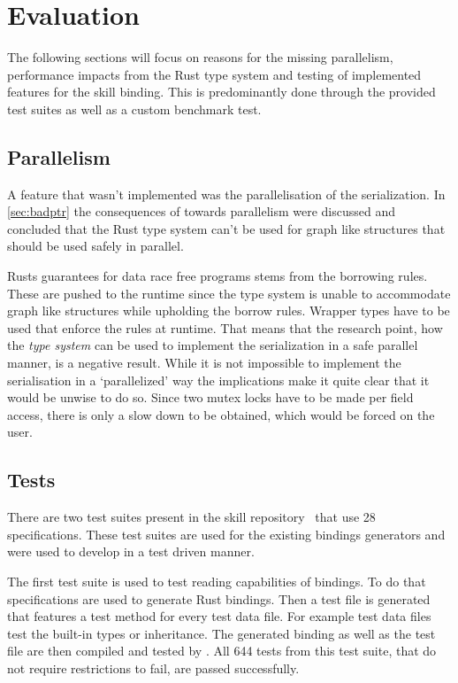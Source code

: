 \documentclass[thesis]{subfiles}
\begin{document}
\chapter{Evaluation}\label{chap:eval}
The following sections will focus on reasons for the missing parallelism, performance impacts from the Rust type system and testing of implemented features for the \gls{skill} binding.
This is predominantly done through the provided test suites as well as a custom benchmark test.

\section{Parallelism}
  A feature that wasn't implemented was the parallelisation of the serialization.
  In \autoref{sec:badptr} the consequences of \PtrT towards parallelism were discussed and concluded that the Rust type system can't be used for graph like structures that should be used safely in parallel.

  Rusts guarantees for data race free programs stems from the borrowing rules.
  These are pushed to the runtime since the type system is unable to accommodate graph like structures while upholding the borrow rules.
  Wrapper types have to be used that enforce the rules at runtime.
  That means that the research point, how the \emph{type system} can be used to implement the serialization in a safe parallel manner, is a negative result.
  While it is not impossible to implement the serialisation in a `parallelized' way the implications make it quite clear that it would be unwise to do so.
  Since two mutex locks have to be made per field access, there is only a slow down to be obtained, which would be forced on the user.

\section{Tests}
  There are two test suites present in the \gls{skill} repository~\autocite{skill-repo} that use 28 specifications.
  These test suites are used for the existing bindings generators and were used to develop in a test driven manner.

  The first test suite is used to test reading capabilities of bindings.
  To do that specifications are used to generate Rust bindings.
  Then a test file is generated that features a test method for every test data file.
  For example test data files test the built-in types or inheritance.
  The generated binding as well as the test file are then compiled and tested by .
  All 644 tests from this test suite, that do not require restrictions to fail, are passed successfully.
\end{document}
